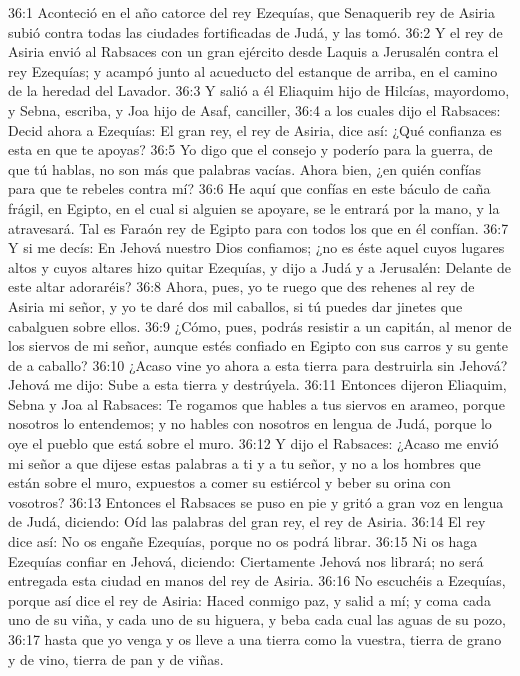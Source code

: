 36:1 Aconteció en el año catorce del rey Ezequías, que Senaquerib rey de Asiria subió contra todas las ciudades fortificadas de Judá, y las tomó. 
36:2 Y el rey de Asiria envió al Rabsaces con un gran ejército desde Laquis a Jerusalén contra el rey Ezequías; y acampó junto al acueducto del estanque de arriba, en el camino de la heredad del Lavador. 
36:3 Y salió a él Eliaquim hijo de Hilcías, mayordomo, y Sebna, escriba, y Joa hijo de Asaf, canciller, 
36:4 a los cuales dijo el Rabsaces: Decid ahora a Ezequías: El gran rey, el rey de Asiria, dice así: ¿Qué confianza es esta en que te apoyas? 
36:5 Yo digo que el consejo y poderío para la guerra, de que tú hablas, no son más que palabras vacías. Ahora bien, ¿en quién confías para que te rebeles contra mí? 
36:6 He aquí que confías en este báculo de caña frágil, en Egipto, en el cual si alguien se apoyare, se le entrará por la mano, y la atravesará. Tal es Faraón rey de Egipto para con todos los que en él confían. 
36:7 Y si me decís: En Jehová nuestro Dios confiamos; ¿no es éste aquel cuyos lugares altos y cuyos altares hizo quitar Ezequías, y dijo a Judá y a Jerusalén: Delante de este altar adoraréis? 
36:8 Ahora, pues, yo te ruego que des rehenes al rey de Asiria mi señor, y yo te daré dos mil caballos, si tú puedes dar jinetes que cabalguen sobre ellos. 
36:9 ¿Cómo, pues, podrás resistir a un capitán, al menor de los siervos de mi señor, aunque estés confiado en Egipto con sus carros y su gente de a caballo? 
36:10 ¿Acaso vine yo ahora a esta tierra para destruirla sin Jehová? Jehová me dijo: Sube a esta tierra y destrúyela. 
36:11 Entonces dijeron Eliaquim, Sebna y Joa al Rabsaces: Te rogamos que hables a tus siervos en arameo, porque nosotros lo entendemos; y no hables con nosotros en lengua de Judá, porque lo oye el pueblo que está sobre el muro. 
36:12 Y dijo el Rabsaces: ¿Acaso me envió mi señor a que dijese estas palabras a ti y a tu señor, y no a los hombres que están sobre el muro, expuestos a comer su estiércol y beber su orina con vosotros? 
36:13 Entonces el Rabsaces se puso en pie y gritó a gran voz en lengua de Judá, diciendo: Oíd las palabras del gran rey, el rey de Asiria. 
36:14 El rey dice así: No os engañe Ezequías, porque no os podrá librar. 
36:15 Ni os haga Ezequías confiar en Jehová, diciendo: Ciertamente Jehová nos librará; no será entregada esta ciudad en manos del rey de Asiria. 
36:16 No escuchéis a Ezequías, porque así dice el rey de Asiria: Haced conmigo paz, y salid a mí; y coma cada uno de su viña, y cada uno de su higuera, y beba cada cual las aguas de su pozo, 
36:17 hasta que yo venga y os lleve a una tierra como la vuestra, tierra de grano y de vino, tierra de pan y de viñas. 
